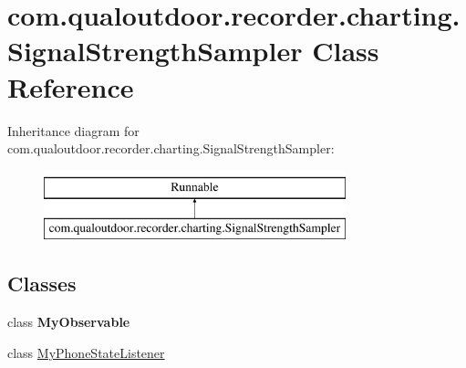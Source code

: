 \hypertarget{classcom_1_1qualoutdoor_1_1recorder_1_1charting_1_1SignalStrengthSampler}{\section{com.\-qualoutdoor.\-recorder.\-charting.\-Signal\-Strength\-Sampler Class Reference}
\label{classcom_1_1qualoutdoor_1_1recorder_1_1charting_1_1SignalStrengthSampler}
}
Inheritance diagram for com.\-qualoutdoor.\-recorder.\-charting.\-Signal\-Strength\-Sampler\-:\begin{figure}[H]
\begin{center}
\leavevmode
\includegraphics[height=2.000000cm]{classcom_1_1qualoutdoor_1_1recorder_1_1charting_1_1SignalStrengthSampler}
\end{center}
\end{figure}
\subsection*{Classes}
\begin{DoxyCompactItemize}
\item 
class {\bfseries My\-Observable}
\item 
class \hyperlink{classcom_1_1qualoutdoor_1_1recorder_1_1charting_1_1SignalStrengthSampler_1_1MyPhoneStateListener}{My\-Phone\-State\-Listener}
\end{DoxyCompactItemize}
